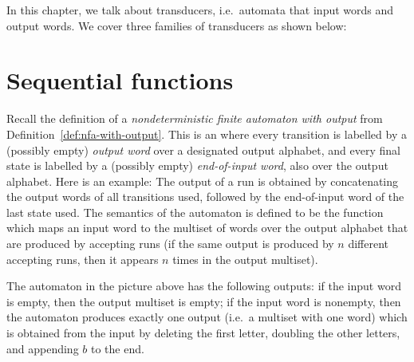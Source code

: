 In this chapter, we talk about transducers, i.e.~automata that input words and output words. We cover three families  of transducers as shown below:  
\section{Sequential   functions}
Recall the definition of a \emph{nondeterministic finite automaton with output} from Definition~\ref{def:nfa-with-output}. This is an \nfa  where every transition is labelled by a  (possibly empty) \emph{output word} over a designated output alphabet, and every final state is labelled by a (possibly empty)  \emph{end-of-input word}, also over the output alphabet. Here is an example:
 The output of a run is obtained by concatenating the output words of all transitions used, followed by the end-of-input word of the last state used. The semantics of the automaton is defined to be the function which maps an input word to the multiset of words over the output alphabet that are produced by accepting runs (if the same output is produced by $n$ different accepting runs, then it appears $n$ times in the output multiset).
 
  The automaton in the picture above has the following outputs: if the input word is empty, then the output multiset is empty; if the input word is nonempty, then the automaton produces exactly one output (i.e.~a multiset with one word) which is obtained from the input by deleting the first letter, doubling the other letters, and appending $b$ to the end.

